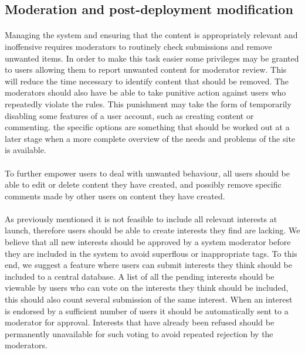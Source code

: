 \subsection{Moderation and post-deployment modification} %
\label{subsec:FurtherRequiredMod}

\paragraph{} Managing the system and ensuring that the content is appropriately relevant and inoffensive requires moderators to routinely check submissions and remove unwanted items. In order to make this task easier some privileges may be granted to users allowing them to report unwanted content for moderator review.  This will reduce the time necessary to identify content that should be removed. The moderators should also have be able to take punitive action against users who repeatedly violate the rules. This punishment may take the form of temporarily disabling some features of a user account, such as creating content or commenting. the specific options are something that should be worked out at a later stage when a more complete overview of the needs and problems of the site is available.

\paragraph{} To further empower users to deal with unwanted behaviour, all users should be able to edit or delete content they have created, and possibly remove specific comments made by other users on content they have created.

\paragraph{} As previously mentioned it is not feasible to include all relevant interests at launch, therefore users should be able to create interests they find are lacking. We believe that all new interests should be approved by a system moderator before they are included in the system to avoid superflous or inappropriate tags. To this end, we suggest a feature where users can submit interests they think should be included to a central database. A list of all the pending interests should be viewable by users who can vote on the interests they think should be included, this should also count several submission of the same interest. When an interest is endorsed by a sufficient number of users it should be automatically sent to a moderator for approval. Interests that have already been refused should be permanently unavailable for such voting to avoid repeated rejection by the moderators.

